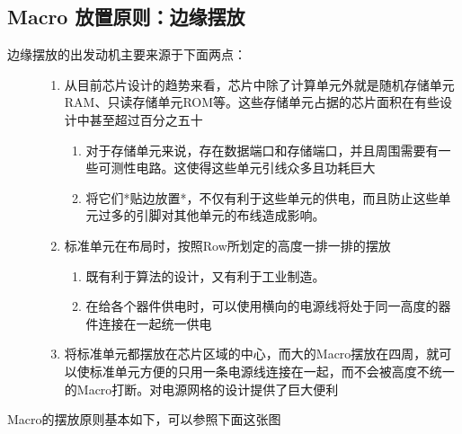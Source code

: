 \documentclass[letterpaper,10pt,english]{sphinxmanual}
\begin{document}
\subsection{Macro 放置原则：边缘摆放}
\label{\detokenize{chapter5/_u5e03_u5c40Macro:id1}}\begin{description}
\item[{边缘摆放的出发动机主要来源于下面两点：}] \leavevmode\begin{enumerate}
%
\item {} 
\sphinxAtStartPar
从目前芯片设计的趋势来看，芯片中除了计算单元外就是随机存储单元RAM、只读存储单元ROM等。这些存储单元占据的芯片面积在有些设计中甚至超过百分之五十
\begin{enumerate}
%
\item {} 
\sphinxAtStartPar
对于存储单元来说，存在数据端口和存储端口，并且周围需要有一些可测性电路。这使得这些单元引线众多且功耗巨大

\item {} 
\sphinxAtStartPar
将它们*贴边放置*，不仅有利于这些单元的供电，而且防止这些单元过多的引脚对其他单元的布线造成影响。

\end{enumerate}

\item {} 
\sphinxAtStartPar
标准单元在布局时，按照Row所划定的高度一排一排的摆放
\begin{enumerate}
%
\item {} 
\sphinxAtStartPar
既有利于算法的设计，又有利于工业制造。

\item {} 
\sphinxAtStartPar
在给各个器件供电时，可以使用横向的电源线将处于同一高度的器件连接在一起统一供电

\end{enumerate}

\item {} 
\sphinxAtStartPar
将标准单元都摆放在芯片区域的中心，而大的Macro摆放在四周，就可以使标准单元方便的只用一条电源线连接在一起，而不会被高度不统一的Macro打断。对电源网格的设计提供了巨大便利

\end{enumerate}

\end{description}

\sphinxAtStartPar
Macro的摆放原则基本如下，可以参照下面这张图

\begin{figure}[htbp]
\centering

\noindent{}
\end{figure}
\end{document}
